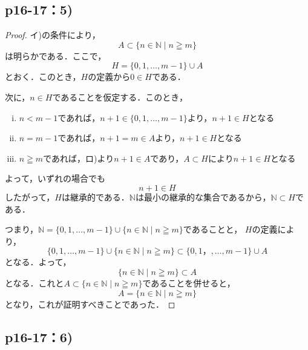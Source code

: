 \documentclass[uplatex,dvipdfmx,a4paper,10pt,fleqn]{jsarticle}
\begin{document}
\newpage 

\subsection*{p16-17：5)}

\begin{tleftbar}
	\begin{proof}
		イ)の条件により，
		\[ 
            A \subset \{n \in \mathbb{N} \mid n \geqq m\} 
        \]
		は明らかである．ここで，
		\[
        H=\{0,1,\dots,m-1\} \cup A
        \]
        とおく．このとき，$H$の定義から$0 \in H$である．

        次に，$n \in H$であることを仮定する．このとき，
        \begin{enumerate}[(i)]
        \item  $n<m-1$であれば，$n+1 \in \{0,1,\dots,m-1\}$より，$n+1 \in H$となる
		\item $n=m-1$であれば，$n+1=m \in A$より，$n+1 \in H$となる
		\item $n \geqq m$であれば，ロ)より$n+1 \in A$であり，$A \subset H $により$n + 1\in H$となる
		\end{enumerate}
		よって，いずれの場合でも
		\[
			n+1 \in H
		\]
		したがって，$H$は継承的である．$\mathbb{N}$は最小の継承的な集合であるから，$\mathbb{N} \subset H$である．

		つまり，$\mathbb{N} =  \{0,1,\dots,m-1\} \cup \{n \in \mathbb{N} \mid n \geqq m \}$であることと，
        $H$の定義により，
		\[
			 \{0,1,\dots,m-1\} \cup \{n \in \mathbb{N} \mid n \geqq m \} \subset \{0,1，,\dots,m-1\} \cup A
		\]
		となる．よって，
		\[
			\{n \in \mathbb{N}\mid n \geqq m \} \subset A
		\]
		となる．これと$ A \subset \{n \in \mathbb{N} \mid n \geqq m\}$であることを併せると，
		\[
			A=\{n \in \mathbb{N} \mid n \geqq m \}
		\]
        となり，これが証明すべきことであった．
	\end{proof}
\end{tleftbar}

\newpage 

\subsection*{p16-17：6)}

\end{document}
